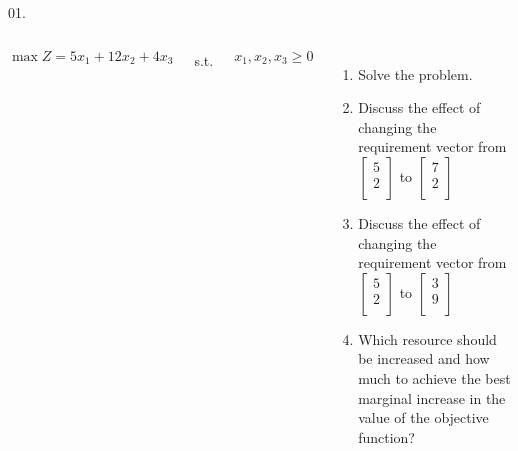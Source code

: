 \begin{frameExample}{01.}{}

  \begin{columns}
      $\max Z = 5x_1 + 12x_2 + 4x_3$

      \vspace{5mm}

      s.t.

  \vspace{5mm}
  
  $x_1 , x_2, x_3 \geq 0$
  \begin{enumerate}[label=\alph*)] \justifying \parskip4mm
  \item Solve the problem.
  \item Discuss the effect of changing the requirement vector from $%
    \begin{bmatrix}
      5\\
      2\\
    \end{bmatrix}
    $%
    to%
    $
    \begin{bmatrix}
      7\\
      2\\
    \end{bmatrix}
$
\item Discuss the effect of changing the requirement vector from %
  $
  \begin{bmatrix}
    5\\2\\
  \end{bmatrix}
  $
  to%
  $
  \begin{bmatrix}
    3\\9\\
  \end{bmatrix}
  $
  \item Which resource should be increased and how much to achieve the best marginal increase in the value of the objective function?
  \end{enumerate}
  \end{columns}
\end{frameExample}


